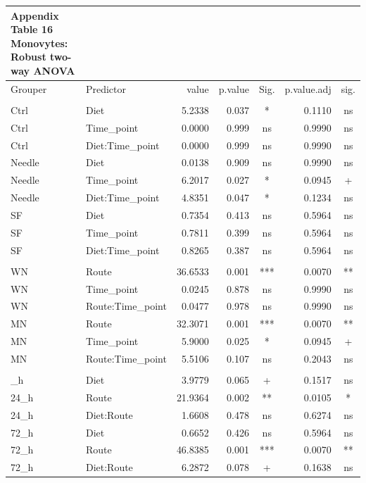 \documentclass[
  12pt,
  letterpaper,
]{article}
\begin{document}
\begingroup
\fontsize{12.0pt}{14.4pt}\selectfont
\begin{longtable}{l|lrrcrc}
\caption*{
{\large \textbf{Appendix Table 16}} \\ 
{\small \textbf{Monovytes: Robust two-way ANOVA}}
} \\ 
\toprule
Grouper & {Predictor} & {value} & {p.value} & {Sig.} & {p.value.adj} & {sig.} \\ 
\midrule\addlinespace[2.5pt]
\multicolumn{7}{l}{Grouped by Route} \\[2.5pt] 
\midrule\addlinespace[2.5pt]
Ctrl & Diet & 5.2338 & 0.037 & * & 0.1110 & ns \\ 
Ctrl & Time\_point & 0.0000 & 0.999 & ns & 0.9990 & ns \\ 
Ctrl & Diet:Time\_point & 0.0000 & 0.999 & ns & 0.9990 & ns \\ 
Needle & Diet & 0.0138 & 0.909 & ns & 0.9990 & ns \\ 
Needle & Time\_point & 6.2017 & 0.027 & * & 0.0945 & + \\ 
Needle & Diet:Time\_point & 4.8351 & 0.047 & * & 0.1234 & ns \\ 
SF & Diet & 0.7354 & 0.413 & ns & 0.5964 & ns \\ 
SF & Time\_point & 0.7811 & 0.399 & ns & 0.5964 & ns \\ 
SF & Diet:Time\_point & 0.8265 & 0.387 & ns & 0.5964 & ns \\ 
\midrule\addlinespace[2.5pt]
\multicolumn{7}{l}{Grouped by Diet} \\[2.5pt] 
\midrule\addlinespace[2.5pt]
WN & Route & 36.6533 & 0.001 & *** & 0.0070 & ** \\ 
WN & Time\_point & 0.0245 & 0.878 & ns & 0.9990 & ns \\ 
WN & Route:Time\_point & 0.0477 & 0.978 & ns & 0.9990 & ns \\ 
MN & Route & 32.3071 & 0.001 & *** & 0.0070 & ** \\ 
MN & Time\_point & 5.9000 & 0.025 & * & 0.0945 & + \\ 
MN & Route:Time\_point & 5.5106 & 0.107 & ns & 0.2043 & ns \\ 
\midrule\addlinespace[2.5pt]
\multicolumn{7}{l}{Grouped by Time\_point} \\[2.5pt] 
\midrule\addlinespace[2.5pt]
24\_h & Diet & 3.9779 & 0.065 & + & 0.1517 & ns \\ 
24\_h & Route & 21.9364 & 0.002 & ** & 0.0105 & * \\ 
24\_h & Diet:Route & 1.6608 & 0.478 & ns & 0.6274 & ns \\ 
72\_h & Diet & 0.6652 & 0.426 & ns & 0.5964 & ns \\ 
72\_h & Route & 46.8385 & 0.001 & *** & 0.0070 & ** \\ 
72\_h & Diet:Route & 6.2872 & 0.078 & + & 0.1638 & ns \\ 
\bottomrule
\end{longtable}
\endgroup
\end{document}

